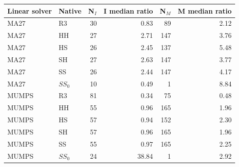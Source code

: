 \begin{tabular}{@{}llrrrr@{}}
\toprule
Linear solver & Native & N$_I$ & I median ratio & N$_M$ & M median ratio\\
\midrule
MA27 & R3 & 30 & 0.83 & 89 & 2.12\\
MA27 & HH & 27 & 2.71 & 147 & 3.76\\
MA27 & HS & 26 & 2.45 & 137 & 5.48\\
MA27 & SH & 27 & 2.63 & 147 & 3.77\\
MA27 & SS & 26 & 2.44 & 147 & 4.17\\
MA27 & $SS_0$ & 10 & 0.49 & 1 & 8.84\\
MUMPS & R3 & 81 & 0.34 & 75 & 0.48\\
MUMPS & HH & 55 & 0.96 & 165 & 1.96\\
MUMPS & HS & 57 & 0.94 & 152 & 2.30\\
MUMPS & SH & 57 & 0.96 & 165 & 1.96\\
MUMPS & SS & 55 & 0.97 & 165 & 2.25\\
MUMPS & $SS_0$ & 24 & 38.84 & 1 & 2.92\\
\bottomrule
\end{tabular}
